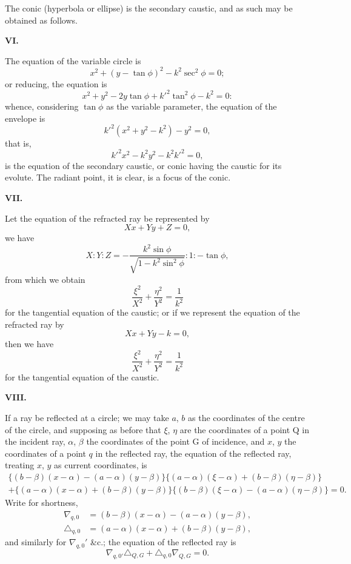 \documentclass[11pt,a4paper]{book}
\begin{document}
\begin{center}
The conic (hyperbola or ellipse) is the secondary caustic, and as such may be
obtained as follows.

\medskip
\noindent\textbf{VI.}

The equation of the variable circle is
\[x^2 + (y - \tan\phi)^2 - k^2\sec^2\phi = 0;\]
or reducing, the equation is
\[x^2 + y^2 - 2y\tan\phi + k'^2\tan^2\phi - k^2 = 0:\]
whence, considering $\tan\phi$ as the variable parameter, the equation of the envelope is
\[k'^2(x^2+y^2-k^2) - y^2 = 0,\]
that is,
\[k'^2x^2 - k^2y^2 - k^2k'^2 = 0,\]
is the equation of the secondary caustic, or conic having the caustic for its evolute.
The radiant point, it is clear, is a focus of the conic.

\medskip
\noindent\textbf{VII.}

Let the equation of the refracted ray be represented by
\[Xx + Yy + Z = 0,\]
we have
\[X : Y : Z = -\frac{k^2\sin\phi}{\sqrt{1-k^2\sin^2\phi}} : 1 : -\tan\phi,\]
from which we obtain
\[\frac{\xi^2}{X^2} + \frac{\eta^2}{Y^2} = \frac{1}{k^2}\]
for the tangential equation of the caustic; or if we represent the equation of the
refracted ray by
\[Xx + Yy - k = 0,\]
then we have
\[\frac{\xi^2}{X^2} + \frac{\eta^2}{Y^2} = \frac{1}{k^2}\]
for the tangential equation of the caustic.

\clearpage
\noindent\textbf{VIII.}

If a ray be reflected at a circle; we may take $a$, $b$ as the coordinates of
the centre of the circle, and supposing as before that $\xi$, $\eta$ are the coordinates of
a point Q in the incident ray, $\alpha$, $\beta$ the coordinates of the point G of incidence,
and $x$, $y$ the coordinates of a point $q$ in the reflected ray, the equation of the
reflected ray, treating $x$, $y$ as current coordinates, is
\begin{multline*}
\{(b-\beta)(x-\alpha) - (a-\alpha)(y-\beta)\}\{(a-\alpha)(\xi-\alpha) + (b-\beta)(\eta-\beta)\}\\
+ \{(a-\alpha)(x-\alpha) + (b-\beta)(y-\beta)\}\{(b-\beta)(\xi-\alpha) - (a-\alpha)(\eta-\beta)\} = 0.
\end{multline*}
Write for shortness,
\begin{align*}
\nabla_{q,0} &= (b-\beta)(x-\alpha) - (a-\alpha)(y-\beta),\\
\triangle_{q,0} &= (a-\alpha)(x-\alpha) + (b-\beta)(y-\beta),
\end{align*}
and similarly for $\nabla_{q,0}'$ \&c.; the equation of the reflected ray is
\[\nabla_{q,0'}\triangle_{Q,G} + \triangle_{q,0}\nabla_{Q,G} = 0.\]


\end{center}
\end{document}
